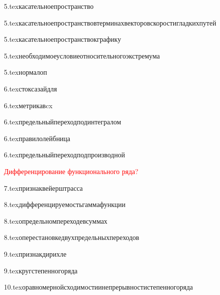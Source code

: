 {5.tex}{касательноепространство}

{5.tex}{касательноепространствовтерминахвекторовскоростигладкихпутей}

{5.tex}{касательноепространствокграфику}

{5.tex}{необходимоеусловиеотносительногоэкстремума}

{5.tex}{нормалоп}

{6.tex}{стоксазайдля}

{6.tex}{метрикавcx}

{6.tex}{предельныйпереходподинтегралом}

{6.tex}{правилолейбница}

{6.tex}{предельныйпереходподпроизводной}

\textcolor{red}{Дифференцирование функционального ряда?}

{7.tex}{признаквейерштрасса}

{8.tex}{дифференцируемостьгаммафункции}

{8.tex}{определьномпереходевсуммах}

{8.tex}{оперестановкедвухпредельныхпереходов}

{9.tex}{признакдирихле}

{9.tex}{кругстепенногоряда}

{10.tex}{оравномернойсходимостиинепрерывностистепенногоряда}

